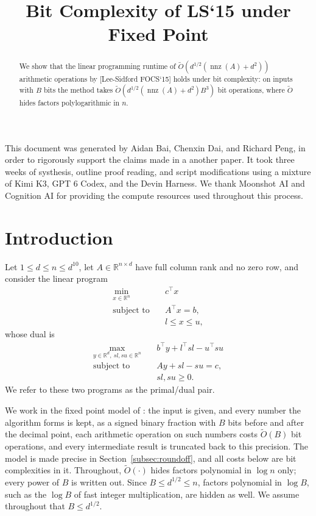 \documentclass[11pt]{article}
\title{Bit Complexity of LS`15 under Fixed Point}
\author{}
\date{}
\newcommand{\R}{\mathbb R}
\newcommand{\nnz}{\operatorname{nnz}}
\renewcommand{\O}{\widetilde O}
\begin{document}
\maketitle

\begin{abstract}
We show that the linear programming runtime of $\O(d^{1/2} ( \nnz(A) + d^2 ))$
arithmetic operations by [Lee-Sidford FOCS`15] holds under bit complexity: on
inputs with $B$ bits the method takes
$\O(d^{1/2} ( \nnz(A) + d^2 ) B^{3})$ bit operations, where
$\O$ hides factors polylogarithmic in
$n$.
\end{abstract}

This document was generated by Aidan Bai, Chenxin Dai, and Richard Peng,
in order to rigorously support the claims made in a another paper.
It took three weeks of systhesis, outline proof reading, and script
modifications using a mixture of Kimi K3, GPT 6 Codex, and the Devin Harness.
We thank Moonshot AI and Cognition AI for providing the compute resources
used throughout this process.

\section{Introduction}
\label{sec:intro}

Let $1\leq d \leq n \leq d^{10}$, let
$A\in\R^{n \times d}$ have full column rank and no zero row, and consider the
linear program
\begin{align}
\min_{x\in\R^n} \quad & c^\top x \tag{primal} \label{eq:primal}\\
\text{subject to} \quad & A^\top x = b, \nonumber\\
& l\le x\le u, \nonumber
\end{align}
whose dual is
\begin{align}
\max_{y\in\R^d,\ sl,su\in\R^n} \quad & b^\top y + l^\top sl - u^\top su \tag{dual} \label{eq:dual}\\
\text{subject to} \quad & Ay + sl - su = c, \nonumber\\
& sl, su \geq 0 . \nonumber
\end{align}
We refer to these two programs as the primal/dual pair.

We work in the fixed point model of \cite{GPV23}: the input
is given, and every number the algorithm forms is kept, as a signed binary
fraction with $B$ bits before and after the decimal point, each arithmetic
operation on such numbers costs $\O(B)$ bit operations, and every intermediate
result is truncated back to this precision.
The model is made precise in Section~\ref{subsec:roundoff}, and all costs below
are bit complexities in it.
Throughout, $\O(\cdot)$ hides factors polynomial in
$\log n$ only; every power of
$B$ is written out.
Since $B \le d^{1/2} \le n$, factors polynomial in
$\log B$, such as the
$\log B$ of fast integer multiplication, are hidden as well.
We assume throughout that $B \le d^{1/2}$.
\end{document}
